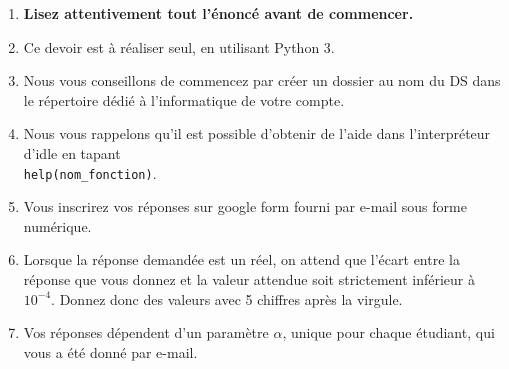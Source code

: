 \begin{enumerate}
\item  \textbf{Lisez attentivement  tout l'énoncé avant de commencer.}
\item Ce devoir est à réaliser seul, en utilisant Python 3.
\item Nous vous conseillons de commencez par créer un dossier au nom du DS dans le répertoire dédié à l'informatique de votre compte. 
\item Nous vous rappelons qu'il est possible d'obtenir de l'aide dans l'interpréteur d'idle en tapant \\
\texttt{help(nom\_fonction)}.
\item Vous inscrirez vos réponses sur google form fourni par e-mail sous forme numérique.
\item Lorsque la réponse demandée est un réel, on attend que l'écart entre la réponse que vous donnez et la valeur attendue soit strictement inférieur à $10^{-4}$. Donnez donc des valeurs avec 5 chiffres après la virgule.
\item Vos réponses dépendent d'un paramètre $\alpha$, unique pour chaque étudiant, qui vous a été donné par e-mail.
\end{enumerate}




